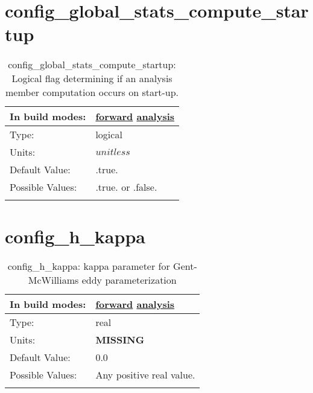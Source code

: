 \section[config\_global\_stats\_compute\_startup]{config\_global\_stats\_compute\_startup}
\label{sec:nm_sec_config_global_stats_compute_startup}
\begin{center}
\begin{longtable}{| p{2.0in} || p{4.0in} |}
    \hline
    In build modes: & \hyperref[subsec:forward_nm_tab_global_stats]{forward} \hyperref[subsec:analysis_nm_tab_global_stats]{analysis} \\
    \hline
    Type: & logical \\
    \hline
    Units: & $unitless$ \\
    \hline
    Default Value: & .true. \\
    \hline
    Possible Values: & .true. or .false. \\
    \hline
    \caption{config\_global\_stats\_compute\_startup: Logical flag determining if an analysis member computation occurs on start-up.}
\end{longtable}
\end{center}
\section[config\_h\_kappa]{config\_h\_kappa}
\label{sec:nm_sec_config_h_kappa}
\begin{center}
\begin{longtable}{| p{2.0in} || p{4.0in} |}
    \hline
    In build modes: & \hyperref[subsec:forward_nm_tab_standard_GM]{forward} \hyperref[subsec:analysis_nm_tab_standard_GM]{analysis} \\
    \hline
    Type: & real \\
    \hline
    Units: & {\bf \color{red} MISSING} \\
    \hline
    Default Value: & 0.0 \\
    \hline
    Possible Values: & Any positive real value. \\
    \hline
    \caption{config\_h\_kappa: kappa parameter for Gent-McWilliams eddy parameterization}
\end{longtable}
\end{center}
